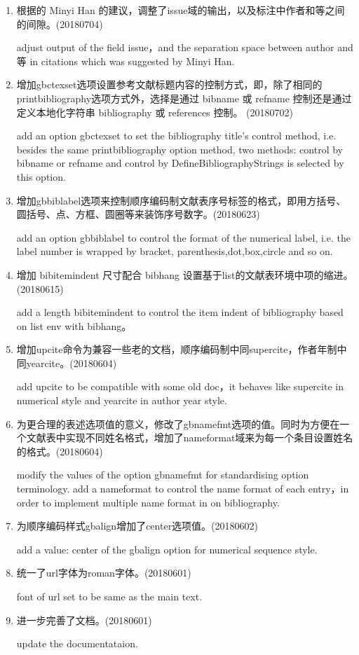 \label{up:180601}
\begin{enumerate}

\item 根据的 Minyi Han 的建议，调整了issue域的输出，以及标注中作者和等之间的间隙。(20180704)

adjust output of the field issue，and the separation space between author and 等 in citations which was suggested by Minyi Han.


\item 增加gbctexset选项设置参考文献标题内容的控制方式，即，除了相同的printbibliography选项方式外，选择是通过 bibname 或 refname 控制还是通过定义本地化字符串 bibliography 或 references 控制。 (20180702)

add an option gbctexset to set the bibliography title's control method, i.e. besides the same printbibliography option method, two methods: control by bibname or refname and control by DefineBibliographyStrings is selected by this option.

\item 增加gbbiblabel选项来控制顺序编码制文献表序号标签的格式，即用方括号、圆括号、点、方框、圆圈等来装饰序号数字。(20180623)

add an option gbbiblabel to control the format of the numerical label, i.e. the label number is wrapped by bracket, parenthesis,dot,box,circle and so on.

\item 增加 bibitemindent 尺寸配合 bibhang 设置基于list的文献表环境中项的缩进。(20180615)

add a length bibitemindent to control the item indent of bibliography based on list env with bibhang。

\item 增加upcite命令为兼容一些老的文档，顺序编码制中同supercite，作者年制中同yearcite。(20180604)

add upcite to be compatible with some old doc，it behaves like supercite in numerical style and yearcite in author year style.

\item 为更合理的表述选项值的意义，修改了gbnamefmt选项的值。同时为方便在一个文献表中实现不同姓名格式，增加了nameformat域来为每一个条目设置姓名的格式。(20180604)

modify the values of the option gbnamefmt for standardising option terminology. add a nameformat to control the name format of each entry，in order to implement multiple name format in on bibliography.

\item 为顺序编码样式gbalign增加了center选项值。(20180602)

add a value: center of the gbalign option for numerical sequence style.

\item 统一了url字体为roman字体。(20180601)

font of url set to be same as the main text.


\item 进一步完善了文档。(20180601)

update the documentataion.
\end{enumerate}


